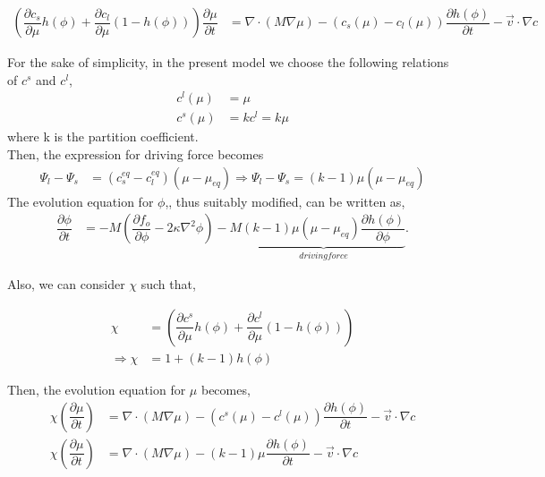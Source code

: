 \documentclass[a4paper]{report}
\begin{document}
 \begin{align}
 \left(\dfrac{\partial c_s}{\partial \mu}h\left(\phi\right) + \dfrac{\partial c_l}{\partial \mu}(1-h\left(\phi\right))\right)
 \dfrac{\partial \mu}{\partial t} &= \nabla \cdot \left(M\nabla\mu\right) 
 - \left(c_s\left(\mu\right) - c_l \left(\mu\right)\right)\dfrac{\partial h\left(\phi\right)}{\partial t} - \vec{v}\cdot\nabla c
 \label{Mass-conservation-alloys}
 \end{align}

For the sake of simplicity, in the present model we choose the following relations of $c^s$ and $c^l$,
\begin{align}
c^l\left(\mu\right) &= \mu \\
c^s\left(\mu\right) &= kc^l = k\mu
\end{align}
where k is the partition coefficient.\\

Then, the expression for driving force becomes
\begin{align}
 \Psi_l-\Psi_s &= (c_s^{eq} - c_l^{eq})\left(\mu-\mu_{eq}\right)
\Rightarrow \Psi_l-\Psi_s = (k - 1)\mu\left(\mu-\mu_{eq}\right)
\end{align} 
The evolution equation for $\phi$,, thus suitably modified, can be written as,
  \begin{align}
  \dfrac{\partial \phi}{\partial t} &= -M \left(\dfrac{\partial f_o}{\partial \phi} - 2\kappa\nabla^{2}\phi\right)  
					-M\underbrace{(k - 1)\mu\left(\mu-\mu_{eq}\right)\dfrac{\partial h\left(\phi\right)}{\partial \phi}}_{driving force}.
  \end{align}

Also, we can consider $\chi$ such that,

\begin{align}
	\chi  &= \left(\dfrac{\partial c^s}{\partial \mu}h\left(\phi\right) + \dfrac{\partial c^l}{\partial \mu}(1-h\left(\phi\right))\right)\\
	\Rightarrow\chi &= 1 + \left(k-1\right)h\left(\phi\right)
\end{align}

Then, the evolution equation for $\mu$ becomes,
\begin{align}
		\chi \left(\dfrac{\partial \mu}{\partial t}\right) &= \nabla \cdot \left(M\nabla\mu\right) 
	- \left(c^s\left(\mu\right) - c^l \left(\mu\right)\right)\dfrac{\partial h\left(\phi\right)}{\partial t}- \vec{v}\cdot\nabla c\\
		\chi \left(\dfrac{\partial \mu}{\partial t}\right) &= \nabla \cdot \left(M\nabla\mu\right) 
	- \left(k-1\right)\mu\dfrac{\partial h\left(\phi\right)}{\partial t}- \vec{v}\cdot\nabla c
\end{align}
\end{document}

